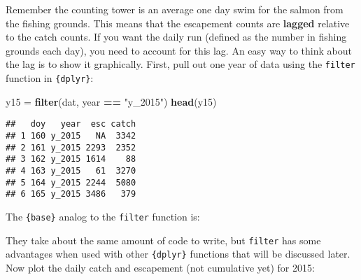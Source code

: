 \documentclass[]{book}
\newenvironment{Shaded}{\begin{snugshade}}{\end{snugshade}}
\newcommand{\KeywordTok}[1]{\textcolor[rgb]{0.13,0.29,0.53}{\textbf{#1}}}
\newcommand{\StringTok}[1]{\textcolor[rgb]{0.31,0.60,0.02}{#1}}
\newcommand{\CommentTok}[1]{\textcolor[rgb]{0.56,0.35,0.01}{\textit{#1}}}
\newcommand{\OperatorTok}[1]{\textcolor[rgb]{0.81,0.36,0.00}{\textbf{#1}}}
\newcommand{\NormalTok}[1]{#1}
\theoremstyle{definition}
\theoremstyle{definition}
\theoremstyle{definition}
\theoremstyle{remark}
\begin{document}
Remember the counting tower is an average one day swim for the salmon
from the fishing grounds. This means that the escapement counts are
\textbf{lagged} relative to the catch counts. If you want the daily run
(defined as the number in fishing grounds each day), you need to account
for this lag. An easy way to think about the lag is to show it
graphically. First, pull out one year of data using the \texttt{filter}
function in \texttt{\{dplyr\}}:

\begin{Shaded}
\begin{Highlighting}[]
\NormalTok{y15 =}\StringTok{ }\KeywordTok{filter}\NormalTok{(dat, year }\OperatorTok{==}\StringTok{ "y_2015"}\NormalTok{)}
\KeywordTok{head}\NormalTok{(y15)}
\end{Highlighting}
\end{Shaded}

\begin{verbatim}
##   doy   year  esc catch
## 1 160 y_2015   NA  3342
## 2 161 y_2015 2293  2352
## 3 162 y_2015 1614    88
## 4 163 y_2015   61  3270
## 5 164 y_2015 2244  5080
## 6 165 y_2015 3486   379
\end{verbatim}

The \texttt{\{base\}} analog to the \texttt{filter} function is:

\begin{Shaded}
\end{Shaded}

They take about the same amount of code to write, but \texttt{filter}
has some advantages when used with other \texttt{\{dplyr\}} functions
that will be discussed later. Now plot the daily catch and escapement
(not cumulative yet) for 2015:
\end{document}
